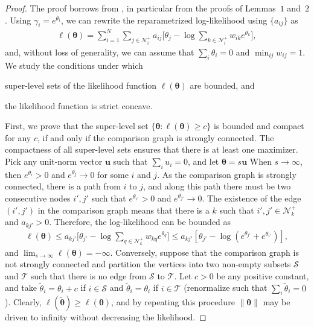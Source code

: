\begin{proof}
The proof borrows from \citet{hunter2004mm}, in particular from the proofs of Lemmas~$1$ and~$2$.
Using $\gamma_i = e^{\theta_i}$, we can rewrite the reparametrized log-likelihood using $\{ a_{ij} \}$ as
\begin{align*}
    \ell(\bm{\theta})
        = \sum_{i = 1}^N \sum_{j \in \mathcal{N}^+_i} a_{ij} \bigg[ \theta_j - \log \sum_{k \in \mathcal{N}^+_i} w_{ik} e^{\theta_k} \bigg],
\end{align*}
and, without loss of generality, we can assume that $\sum_i \theta_i = 0$ and $\min_{ij} w_{ij} = 1$.
We study the conditions under which
\begin{enuminline}
\item super-level sets of the likelihood function $\ell(\bm{\theta})$ are bounded, and
\item the likelihood function is strict concave.
\end{enuminline}

First, we prove that the super-level set $\{ \bm{\theta} : \ell(\bm{\theta}) \ge c \}$ is bounded and compact for any $c$, if and only if the comparison graph is strongly connected.
The compactness of all super-level sets ensures that there is at least one maximizer.
Pick any unit-norm vector $\bm{u}$ such that $\sum_i u_i = 0$, and let $\bm{\theta} = s \bm{u}$
When $s \to \infty$, then $e^{\theta_i} > 0$ and $e^{\theta_j} \to 0 $ for some $i$ and $j$.
As the comparison graph is strongly connected, there is a path from $i$ to $j$, and along this path there must be two consecutive nodes $i', j'$ such that $e^{\theta_{i'}} > 0$ and $e^{\theta_{j'}} \to 0$.
The existence of the edge $(i',j')$ in the comparison graph means that there is a $k$ such that $i', j' \in \mathcal{N}^+_k$ and $a_{kj'} > 0$.
Therefore, the log-likelihood can be bounded as
\begin{align*}
\ell(\bm{\theta})
    \le a_{kj'} \bigg[ \theta_{j'} - \log \sum_{q \in \mathcal{N}^+_k} w_{kq} e^{\theta_q} \bigg]
    \le a_{kj'} \left[ \theta_{j'} - \log (e^{\theta_{j'}} + e^{\theta_{i'}}) \right],
\end{align*}
and $\lim_{s \to \infty} \ell(\bm{\theta}) = -\infty$.
Conversely, suppose that the comparison graph is not strongly connected and partition the vertices into two non-empty subsets $\mathcal{S}$ and $\mathcal{T}$ such that there is no edge from $\mathcal{S}$ to $\mathcal{T}$.
Let $c > 0$ be any positive constant, and take $\tilde{\theta}_i = \theta_i + c$ if $i \in \mathcal{S}$ and $\tilde{\theta}_i = \theta_i$ if $i \in \mathcal{T}$ (renormalize such that $\sum_i \tilde{\theta}_i = 0$).
Clearly, $\ell(\tilde{\bm{\theta}}) \ge \ell(\bm{\theta})$, and by repeating this procedure $\lVert \bm{\theta} \rVert$ may be driven to infinity without decreasing the likelihood.


\end{proof}
